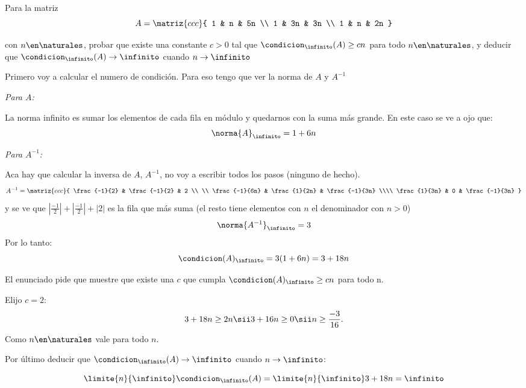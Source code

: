 \begin{enunciado}{\ejercicio}
  Para la matriz
  $$
    A =
    \matriz{ccc}{
      1 & n & 5n \\
      1 & 3n & 3n \\
      1 & n & 2n
    }$$

  con $n \en \naturales$, probar que existe una constante $c > 0$ tal que $\condicion_\infinito(A) \geq cn$ para todo $n \en \naturales$,
  y deducir que $\condicion_\infinito(A) \to \infinito$ cuando $n \to \infinito$
\end{enunciado}

\medskip

Primero voy a calcular el numero de condición. Para eso tengo que ver la norma de $A$ y $A^{-1}$

\textit{Para $A$:}

La norma infinito es sumar los elementos de cada fila en módulo y quedarnos con la suma más grande.
En este caso se ve a ojo que:
$$
  \norma{A}_\infinito = 1 + 6n
$$

\textit{Para $A^{-1}$:}

Aca hay que calcular la inversa de $A$, $A^{-1}$, no voy a escribir todos los pasos (ninguno de hecho).
$$
\everymath{\displaystyle}
  A^{-1} =
  \matriz{ccc}{
    \frac{-1}{2} & \frac{-1}{2} & 2 \\ \\
    \frac{-1}{6n} & \frac{1}{2n} & \frac{-1}{3n} \\\\
    \frac{1}{3n} & 0 & \frac{-1}{3n}
  }
$$
y se ve que $|\frac{-1}{2}| + |\frac{-1}{2}| + |2|$ es la fila que más suma
(el resto tiene elementos con $n$ el denominador con $n > 0$)
$$
  \norma{A^{-1}}_\infinito = 3
$$
Por lo tanto:
$$
  \condicion(A)_\infinito = 3(1 + 6n) = 3 + 18n
$$

El enunciado pide que muestre que existe una $c$ que cumpla $\condicion(A)_\infinito \geq cn$ para todo n.

Elijo $c = 2$:
$$
  3 + 18n \geq 2n \sii 3 + 16n \geq 0 \sii n \geq \frac{-3}{16}.
$$
Como $n \en \naturales$ vale para todo $n$.

Por último deducir que $\condicion_\infinito(A) \to \infinito$ cuando $n \to \infinito$:

$$
  \limite{n}{\infinito}\condicion_\infinito(A) = \limite{n}{\infinito} 3+18n = \infinito
$$

\begin{aportes}
  \item {}
\end{aportes}
